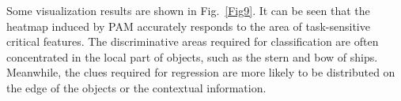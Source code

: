\documentclass[journal]{IEEEtran}
\begin{document}
Some visualization results are shown in Fig.~\ref{Fig9}. It can be seen that the heatmap induced by PAM accurately responds to the area of task-sensitive critical features. The discriminative areas required for classification are often concentrated in the local part of objects, such as the stern and bow of ships. Meanwhile, the clues required for regression are more likely to be distributed on the edge of the objects or the contextual information. 



\begin{table}
	\renewcommand\arraystretch{1.1}
	\centering
	\caption{Ablation study of DAL.}
	\label{Table3}
\end{table}


\begin{table}[t]
	\renewcommand\arraystretch{1.1}
	\centering
	\caption{ Ablation study of the proposed R-ARM.}
	\label{Table4}
\end{table}
\end{document}
